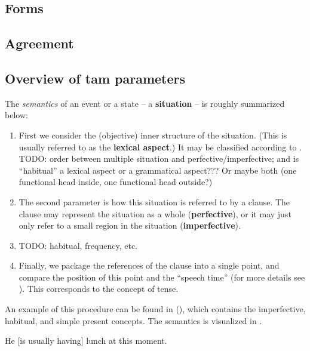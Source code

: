 \documentclass[UTF8, a4paper, oneside, scheme=plain]{ctexrep}
\newcommand*{\citepage}[1]{p.~{#1}}
\newcommand*{\concept}[1]{\textbf{#1}}
\begin{document}
\subsection{Forms}

\subsection{Agreement}

\subsection{Overview of \acs{tam} parameters}

The \emph{semantics} of an event or a state -- 
a \concept{situation} -- is roughly summarized below:
\begin{enumerate}
    \item First we consider the (objective) inner structure of the situation.
    (This is usually referred to as the \concept{lexical aspect}.)
    It may be classified according to \citet[\citepage{118}, {[6]}]{cgel}.
    TODO: order between multiple situation and perfective/imperfective;
    and is ``habitual'' a lexical aspect or a grammatical aspect???
    Or maybe both (one functional head inside, one functional head outside?)
    \item The second parameter is 
    how this situation is referred to by a clause. 
    The clause may represent the situation as a whole (\concept{perfective}),
    or it may just only refer to a small region in the situation (\concept{imperfective}).
    \item TODO: habitual, frequency, etc. 
    \item Finally, we package the references of the clause into a single point, 
    and compare the position of this point and the ``speech time'' 
    (for more details see 
    ).
    This corresponds to the concept of tense.
\end{enumerate}

An example of this procedure can be found in (),
which contains the imperfective, habitual, and simple present concepts. 
The semantics is visualized in .

\begin{exe}
    \ex\label{ex:verb-inflection.semantics.1} He [is usually having] lunch at this moment. 
\end{exe}
\end{document}
